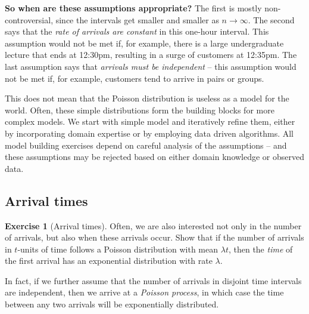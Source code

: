 \documentclass[11pt]{article}
\theoremstyle{definition}
\newtheorem{exercise}[]{Exercise}
\begin{document}
\textbf{So when are these assumptions appropriate?} The first is
mostly non-controversial,
since the intervals get smaller and smaller as  $n\rightarrow\infty$.
The second says that the \textit{rate of arrivals are constant} in this one-hour interval.
This assumption would not be met if, for example, there is a large undergraduate lecture that ends at 12:30pm, resulting in a surge of customers at 12:35pm.
The last assumption says that \textit{arrivals must be independent} -- this assumption would not be met if,
for example, customers tend to arrive in pairs or groups.

This does not mean that the Poisson distribution is useless as a model for the world.
Often, these simple distributions form the building blocks for more complex models. We start with simple model
and iteratively refine them, either by incorporating
domain expertise or by employing data driven algorithms.
All model building exercises depend on careful analysis of the assumptions --
and these assumptions may be rejected based on either
domain knowledge or observed data.

\subsection{Arrival times}

\begin{exercise}[Arrival times]
Often, we are also interested not only in the number of arrivals,
but also when these arrivals occur.
Show that if the number of arrivals in $t$-units of time
follows a Poisson distribution with mean $\lambda t$,
then the \textit{time} of the first arrival
has an exponential distribution with rate $\lambda$.

\end{exercise}


In fact, if we further assume that the number of arrivals in
disjoint time intervals are independent, then
we arrive at a \textit{Poisson process},
in which case the time between any two arrivals will be exponentially distributed.


\end{document}
